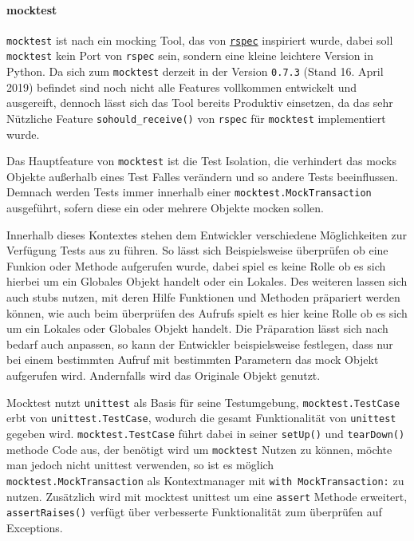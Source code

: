 \paragraph{mocktest}\label{python-tools:mocktest}\mbox{}
\newline
\lstinline{mocktest} ist nach \cite{mocktest:doc} ein \gls{mock}ing Tool, das von
\href{http://rspec.info/}{\lstinline{rspec}} inspiriert wurde, dabei soll
\lstinline{mocktest} kein Port von \lstinline{rspec} sein, sondern eine kleine leichtere Version in Python.
Da sich zum \lstinline{mocktest} derzeit in der Version \lstinline{0.7.3} (Stand 16. April 2019) befindet sind
noch nicht alle Features vollkommen entwickelt und ausgereift, dennoch lässt sich das Tool bereits Produktiv einsetzen,
da das sehr Nützliche Feature \lstinline{sohould_receive()} von \lstinline{rspec} für \lstinline{mocktest} implementiert wurde.

Das Hauptfeature von \lstinline{mocktest} ist die Test Isolation, die verhindert das \glspl{mock} Objekte außerhalb eines
Test Falles verändern und so andere Tests beeinflussen. Demnach werden Tests immer innerhalb einer \lstinline{mocktest.MockTransaction} ausgeführt, sofern diese ein oder mehrere Objekte \gls{mock}en sollen.

Innerhalb dieses Kontextes stehen dem Entwickler verschiedene Möglichkeiten zur Verfügung Tests aus zu führen. So lässt
sich Beispielsweise überprüfen ob eine Funkion oder Methode aufgerufen wurde, dabei spiel es keine Rolle ob es sich hierbei
um ein Globales Objekt handelt oder ein Lokales. Des weiteren lassen sich auch \Glspl{stub} nutzen, mit deren Hilfe
Funktionen und Methoden präpariert werden können, wie auch beim überprüfen des Aufrufs spielt es hier keine Rolle ob es
sich um ein Lokales oder Globales Objekt handelt. Die Präparation lässt sich nach bedarf auch anpassen, so kann der
Entwickler beispielsweise festlegen, dass nur bei einem bestimmten Aufruf mit bestimmten Parametern das \Gls{mock} Objekt
aufgerufen wird. Andernfalls wird das Originale Objekt genutzt.

Mocktest nutzt \lstinline{unittest} als Basis für seine Testumgebung, \lstinline{mocktest.TestCase} erbt von
\lstinline{unittest.TestCase}, wodurch die gesamt Funktionalität von \lstinline{unittest} gegeben wird. \lstinline{mocktest.TestCase} führt dabei in seiner \lstinline{setUp()} und \lstinline{tearDown()} methode Code aus, der
benötigt wird um \lstinline{mocktest} Nutzen zu können, möchte man jedoch nicht unittest verwenden, so ist es möglich
\lstinline{mocktest.MockTransaction} als Kontextmanager mit \lstinline{with MockTransaction:} zu nutzen. Zusätzlich wird
mit mocktest unittest um eine \lstinline{assert} Methode erweitert, \lstinline{assertRaises()} verfügt über verbesserte Funktionalität zum überprüfen auf Exceptions.

